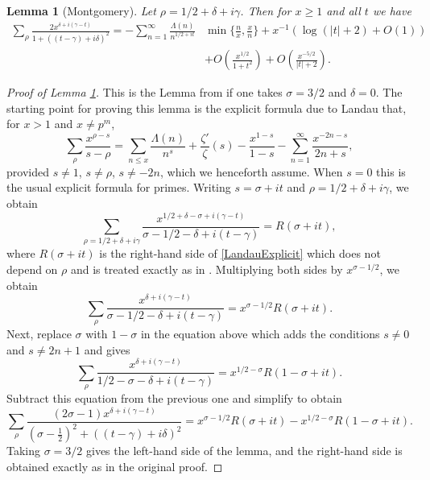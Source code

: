 \documentclass{amsart}
\newcommand{\1}{\mathbbm{1}}
\newtheorem{lem}{Lemma}
\theoremstyle{remark}
\numberwithin{equation}{section}
\begin{document}
\begin{lem}[Montgomery]\label{lem1} Let $\rho= 1/2+\delta +i\gamma$. Then for $x\ge 1$ and all $t$ we have
\begin{equation}\label{Explicit1}
\begin{split}
\sum_\rho \frac{ 2x^{\delta + i(\gamma-t)}}{1+((t-\gamma)+i\delta)^2} = 
-\sum_{n=1}^\infty\frac{\Lambda(n)}{n^{1/2+it}} & \min\big\{\frac{n}{x},\frac{x}{n}\big\} + x^{-1} \left(\log( |t|+2) + O(1) \right) \\ & + O\left(\frac{x^{1/2} }{1+t^2}\right) + O\left(\frac{x^{-5/2} }{|t|+2}\right).
\end{split}
\end{equation}
\end{lem}
\begin{proof}[Proof of Lemma \ref{lem1}] This is the Lemma from \cite{Montgomery73} if one takes $\sigma=3/2$ and $\delta=0$. 
The starting point for proving this lemma is the explicit formula due to Landau \cite{Lan09} that, for $x>1$ and $x\neq p^m$,
\begin{equation}\label{LandauExplicit}
\sum_\rho \frac{x^{\rho-s}}{s-\rho} = \sum_{n\le x}\frac{\Lambda(n)}{n^s} + \frac{\zeta'}{\zeta}(s) - \frac{x^{1-s}}{1-s} - \sum_{n=1}^\infty \frac{x^{-2n-s}}{2n+s},
\end{equation}
provided $s\neq 1$, $s \neq \rho$, $s\neq -2n$, which we henceforth assume. When $s=0$ this is the usual explicit formula for primes. Writing $s=\sigma+it$ and $\rho=1/2+\delta+i\gamma$, we obtain
\[ \sum_{\rho=1/2+\delta+i\gamma} \frac{x^{1/2+\delta-\sigma+i(\gamma-t)}}{\sigma-1/2-\delta+i(t-\gamma)} = R(\sigma+it), \]
where $R(\sigma+it)$ is the right-hand side of \eqref{LandauExplicit} which does not depend on $\rho$ and is treated exactly as in \cite{Montgomery73}.
Multiplying both sides by $x^{\sigma-1/2}$, we obtain
\[\sum_\rho \frac{x^{\delta+i(\gamma-t)}}{\sigma-1/2-\delta+i(t-\gamma)} = x^{\sigma-1/2}R(\sigma+it).\]
Next, replace $\sigma$ with $1-\sigma$ in the equation above which adds the conditions $s\neq 0$ and $s\neq 2n+1$ and gives
\[
\sum_\rho \frac{x^{\delta+i(\gamma-t)}}{1/2-\sigma-\delta+i(t-\gamma)} = x^{1/2-\sigma}R(1-\sigma +it). \]
Subtract this equation from the previous one and simplify to obtain
\[ \sum_\rho \frac{(2\sigma-1)x^{\delta+i(\gamma-t)}}{(\sigma - \frac12)^2+((t-\gamma)+i\delta)^2} = x^{\sigma-1/2}R(\sigma+it) - x^{1/2-\sigma}R(1-\sigma +it).\]
Taking $\sigma =3/2$ gives the left-hand side of the lemma, and the right-hand side is obtained exactly as in the original proof. 
\end{proof}
\end{document}
